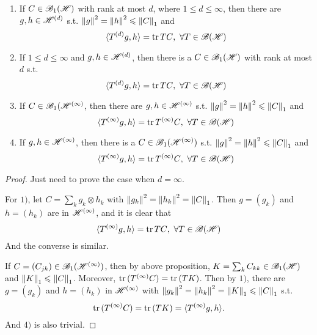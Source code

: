 \begin{thm}
	\begin{enumerate}[label = \arabic*)]
		\item If $C \in \mathscr{B}_{1}\mathscr{(H)}$ with rank at most $d$, where $1 \leqslant d \leqslant \infty$, then there are $g,h \in \mathscr{H}^{(d)}$ s.t. $\left\lVert g\right\lVert^2 = \left\lVert h\right\lVert^2 \leqslant \left\lVert C\right\lVert_1$ and 
		\begin{equation*}
			\langle T^{(d)}g,h \rangle = \operatorname{tr}{TC},~ \forall T \in \mathscr{B(H)}
		\end{equation*}
		\item If $1 \leqslant d \leqslant \infty$ and $g,h \in \mathscr{H}^{(d)}$, then there is a $C \in \mathscr{B}_{1}\mathscr{(H)}$ with rank at most $d$ s.t.
		\begin{equation*}
			\langle T^{(d)}g,h \rangle = \operatorname{tr}{TC},~ \forall T \in \mathscr{B(H)}
		\end{equation*}
		\item If $C \in \mathscr{B}_1(\mathscr{H}^{(\infty)}$, then there are $g,h \in \mathscr{H}^{(\infty)}$ s.t. $\left\lVert g\right\lVert^2 = \left\lVert h\right\lVert^2 \leqslant \left\lVert C\right\lVert_1$ and
		\begin{equation*}
			\langle T^{(\infty)}g,h \rangle = \operatorname{tr}{T^{(\infty)}C},~ \forall T \in \mathscr{B(H)}
		\end{equation*}
		\item If $g,h \in \mathscr{H}^{(\infty)}$, then there is a $C \in \mathscr{B}_1(\mathscr{H}^{(\infty)})$ s.t. $\left\lVert g\right\lVert^2 = \left\lVert h\right\lVert^2 \leqslant \left\lVert C\right\lVert_1$ and
		\begin{equation*}
			\langle T^{(\infty)}g,h \rangle = \operatorname{tr}{T^{(\infty)}C},~ \forall T \in \mathscr{B(H)}
		\end{equation*}
	\end{enumerate}
\end{thm}
\begin{proof}
	Just need to prove the case when $d = \infty$.
	\item For $1)$, let $C = \sum_k g_k \otimes h_k$ with $\left\lVert g_k\right\lVert^2 = \left\lVert h_k\right\lVert^2 = \left\lVert C\right\lVert_1$. Then $g = (g_k)$ and $h = (h_k)$ are in $\mathscr{H}^{(\infty)}$, and it is clear that 
	\begin{equation*}
		\langle T^{(\infty)}g,h \rangle = \operatorname{tr}{TC},~ \forall T \in \mathscr{B(H)}
	\end{equation*}
	And the converse is similar.
	\item If $C = (C_{jk}) \in \mathscr{B}_1(\mathscr{H}^{(\infty)})$, then by above proposition, $K = \sum_k C_{kk} \in \mathscr{B}_{1}\mathscr{(H)}$ and $\left\lVert K\right\lVert_1 \leqslant \left\lVert C\right\lVert_1$. Moreover, $\operatorname{tr}{(T^{(\infty)}C)} = \operatorname{tr}{(TK)}$. Then by $1)$, there are $g = (g_k)$ and $h = (h_k)$ in $\mathscr{H}^{(\infty)}$ with $\left\lVert g_k\right\lVert^2 = \left\lVert h_k\right\lVert^2 = \left\lVert K\right\lVert_1 \leqslant \left\lVert C\right\lVert_1$ s.t.
	\begin{equation*}
		\operatorname{tr}{(T^{(\infty)}C)} = \operatorname{tr}{(TK)} = \langle T^{(\infty)}g,h \rangle.
	\end{equation*}
	And $4)$ is also trivial.
\end{proof}

